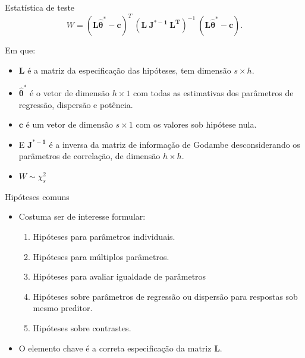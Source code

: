 \documentclass[
  ignorenonframetext,
  serif,
  professionalfont,
  usenames,
  dvipsnames,
  aspectratio = 169]{beamer}
\begin{document}
\begin{frame}{Estatística de teste}
\protect\hypertarget{estatuxedstica-de-teste}{}
\[W = (\boldsymbol{L\hat\theta^{*}} - \boldsymbol{c})^T \ (\boldsymbol{L \ J^{\boldsymbol{*}-1} \ L^T})^{-1} \ (\boldsymbol{L\hat\theta^{*}} - \boldsymbol{c}).\]

Em que:

\begin{itemize}
  \item $\boldsymbol{L}$ é a matriz da especificação das hipóteses, tem dimensão $s \times h$. 

  \item $\boldsymbol{\hat\theta^{*}}$ é o vetor de dimensão $h \times 1$ com todas as estimativas dos parâmetros de regressão, dispersão e potência. 

  \item $\boldsymbol{c}$ é um vetor de dimensão $s \times 1$ com os valores sob hipótese nula. 

  \item E $\boldsymbol{J^{\boldsymbol{*}-1}}$ é a inversa da matriz de informação de Godambe desconsiderando os parâmetros de correlação, de dimensão $h \times h$. 
  
  \item $W \sim \chi^2_s$

\end{itemize}
\end{frame}

\begin{frame}{Hipóteses comuns}
\protect\hypertarget{hipuxf3teses-comuns}{}
\begin{itemize}
  \itemsep 2ex
  
  \item Costuma ser de interesse formular:
    \begin{enumerate}
      \itemsep 2ex
      \item Hipóteses para parâmetros individuais.
      \item Hipóteses para múltiplos parâmetros.
      \item Hipóteses para avaliar igualdade de parâmetros
      \item Hipóteses sobre parâmetros de regressão ou dispersão para respostas sob mesmo preditor.
      \item Hipóteses sobre contrastes.
\end{enumerate}
  
  \item O elemento chave é a correta especificação da matriz $\boldsymbol{L}$.
  
\end{itemize}
\end{frame}
\end{document}
